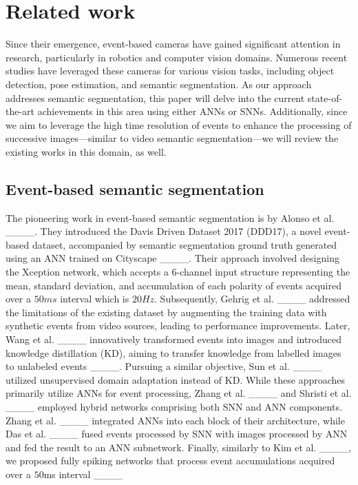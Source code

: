\section{Related work}
\label{related}
Since their emergence, event-based cameras have gained significant attention in research, particularly in robotics and computer vision domains. Numerous recent studies have leveraged these cameras for various vision tasks, including object detection, pose estimation, and semantic segmentation. As our approach addresses semantic segmentation, this paper will delve into the current state-of-the-art achievements in this area using either ANNs or SNNs. Additionally, since we aim to leverage the high time resolution of events to enhance the processing of successive images—similar to video semantic segmentation—we will review the existing works in this domain, as well.
\subsection{Event-based semantic segmentation}
The pioneering work in event-based semantic segmentation is by Alonso et al. ____. They introduced the Davis Driven Dataset 2017 (DDD17), a novel event-based dataset, accompanied by semantic segmentation ground truth generated using an ANN trained on Cityscape ____. Their approach involved designing the Xception network, which accepts a $6$-channel input structure representing the mean, standard deviation, and accumulation of each polarity of events acquired over a $50ms$ interval which is $20Hz$. Subsequently, Gehrig et al. ____ addressed the limitations of the existing dataset by augmenting the training data with synthetic events from video sources, leading to performance improvements. Later, Wang et al. ____ innovatively transformed events into images and introduced knowledge distillation (KD), aiming to transfer knowledge from labelled images to unlabeled events ____. Pursuing a similar objective, Sun et al. ____ utilized unsupervised domain adaptation instead of KD. While these approaches primarily utilize ANNs for event processing, Zhang et al. ____ and Shristi et al. ____ employed hybrid networks comprising both SNN and ANN components. Zhang et al. ____ integrated ANNs into each block of their architecture, while Das et al. ____ fused events processed by SNN with images processed by ANN and fed the result to an ANN subnetwork. Finally, similarly to Kim et al. ____, we proposed fully spiking networks that process event accumulations acquired over a $50$ms interval ____
 
